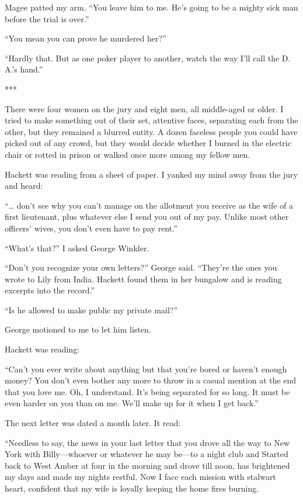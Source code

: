 \documentclass{novel}
\begin{document}
Magee patted my arm. “You leave him to me. He’s going to be a mighty sick man before the trial is over.”

“You mean you can prove he murdered her?”

“Hardly that. But as one poker player to another, watch the way I’ll call the D. A.’s hand.”

***

There were four women on the jury and eight men, all middle-aged or older. I tried to make something out of their set, attentive faces, separating each from the other, but they remained a blurred entity. A dozen faceless people you could have picked out of any crowd, but they would decide whether I burned in the electric chair or rotted in prison or walked once more among my fellow men.

Hackett was reading from a sheet of paper. I yanked my mind away from the jury and heard:

“… don’t see why you can’t manage on the allotment you receive as the wife of a first lieutenant, plus whatever else I send you out of my pay. Unlike most other officers’ wives, you don’t even have to pay rent.”

“What’s that?” I asked George Winkler.

“Don’t you recognize your own letters?” George said. “They’re the ones you wrote to Lily from India. Hackett found them in her bungalow and is reading excerpts into the record.”

“Is he allowed to make public my private mail?”

George motioned to me to let him listen.

Hackett was reading:

“Can’t you ever write about anything but that you’re bored or haven’t enough money? You don’t even bother any more to throw in a casual mention at the end that you love me. Oh, I understand. It’s being separated for so long. It must be even harder on you than on me. We’ll make up for it when I get back.”

The next letter was dated a month later. It read:

“Needless to say, the news in your last letter that you drove all the way to New York with Billy—whoever or whatever he may be—to a night club and Started back to West Amber at four in the morning and drove till noon, has brightened my days and made my nights restful. Now I face each mission with stalwart heart, confident that my wife is loyally keeping the home fires burning.
\end{document}

